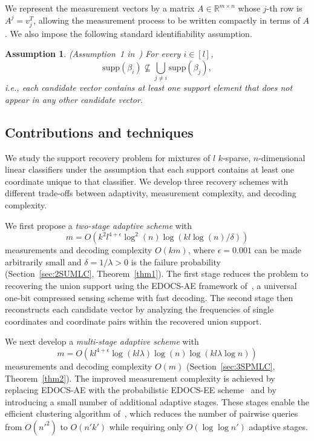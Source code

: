 \documentclass{article}
\newtheorem{assumption}{Assumption}[section]
\newcommand{\supp}{\mathrm{supp}}
\begin{document}
We represent the measurement vectors by a matrix $A\in\mathbb{R}^{m\times n}$ whose $j$-th row is $A^j=v_j^T$, allowing the measurement process to be written compactly in terms of $A$. We also impose the following standard identifiability assumption.

\begin{assumption}\label{Assumption1}
(Assumption~1 in~\cite{gandikota2020recovery})
For every $i\in[l]$,
\[
\supp(\beta_i)\nsubseteq\bigcup_{j\neq i}\supp(\beta_j),
\]
i.e., each candidate vector contains at least one support element that does not appear in any other candidate vector.
\end{assumption}

\subsection{Contributions and techniques}

We study the support recovery problem for mixtures of $l$ $k$-sparse, $n$-dimensional linear classifiers under the assumption that each support contains at least one coordinate unique to that classifier. We develop three recovery schemes with different trade-offs between adaptivity, measurement complexity, and decoding complexity.

We first propose a {\em two-stage adaptive scheme} with
\[
m=O\!\left(k^2l^{4+\epsilon}\log^2(n)\log(kl\log(n)/\delta)\right)
\]
measurements and decoding complexity $O(km)$, where $\epsilon=0.001$ can be made arbitrarily small and $\delta=1/\lambda>0$ is the failure probability (Section~\ref{sec:2SUMLC}, Theorem~\ref{thm1}). The first stage reduces the problem to recovering the union support using the EDOCS-AE framework of~\cite{li2025support}, a universal one-bit compressed sensing scheme with fast decoding. The second stage then reconstructs each candidate vector by analyzing the frequencies of single coordinates and coordinate pairs within the recovered union support.

We next develop a {\em multi-stage adaptive scheme} with
\[
m=O\!\left(kl^{4+\epsilon}\log(kl\lambda)\log(n)\log(kl\lambda\log n)\right)
\]
measurements and decoding complexity $O(m)$ (Section~\ref{sec:3SPMLC}, Theorem~\ref{thm2}). The improved measurement complexity is achieved by replacing EDOCS-AE with the probabilistic EDOCS-EE scheme~\cite{li2025support} and by introducing a small number of additional adaptive stages. These stages enable the efficient clustering algorithm of~\cite{black2025learning}, which reduces the number of pairwise queries from $O(n'^2)$ to $O(n'k')$ while requiring only $O(\log\log n')$ adaptive stages.
\end{document}
